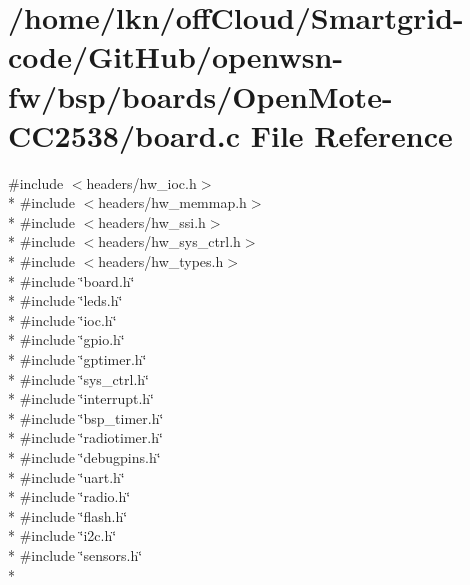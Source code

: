 \hypertarget{_open_mote-_c_c2538_2board_8c}{}\section{/home/lkn/off\+Cloud/\+Smartgrid-\/code/\+Git\+Hub/openwsn-\/fw/bsp/boards/\+Open\+Mote-\/\+C\+C2538/board.c File Reference}
\label{_open_mote-_c_c2538_2board_8c}
{\ttfamily \#include $<$headers/hw\+\_\+ioc.\+h$>$}\\*
{\ttfamily \#include $<$headers/hw\+\_\+memmap.\+h$>$}\\*
{\ttfamily \#include $<$headers/hw\+\_\+ssi.\+h$>$}\\*
{\ttfamily \#include $<$headers/hw\+\_\+sys\+\_\+ctrl.\+h$>$}\\*
{\ttfamily \#include $<$headers/hw\+\_\+types.\+h$>$}\\*
{\ttfamily \#include \char`\"{}board.\+h\char`\"{}}\\*
{\ttfamily \#include \char`\"{}leds.\+h\char`\"{}}\\*
{\ttfamily \#include \char`\"{}ioc.\+h\char`\"{}}\\*
{\ttfamily \#include \char`\"{}gpio.\+h\char`\"{}}\\*
{\ttfamily \#include \char`\"{}gptimer.\+h\char`\"{}}\\*
{\ttfamily \#include \char`\"{}sys\+\_\+ctrl.\+h\char`\"{}}\\*
{\ttfamily \#include \char`\"{}interrupt.\+h\char`\"{}}\\*
{\ttfamily \#include \char`\"{}bsp\+\_\+timer.\+h\char`\"{}}\\*
{\ttfamily \#include \char`\"{}radiotimer.\+h\char`\"{}}\\*
{\ttfamily \#include \char`\"{}debugpins.\+h\char`\"{}}\\*
{\ttfamily \#include \char`\"{}uart.\+h\char`\"{}}\\*
{\ttfamily \#include \char`\"{}radio.\+h\char`\"{}}\\*
{\ttfamily \#include \char`\"{}flash.\+h\char`\"{}}\\*
{\ttfamily \#include \char`\"{}i2c.\+h\char`\"{}}\\*
{\ttfamily \#include \char`\"{}sensors.\+h\char`\"{}}\\*
